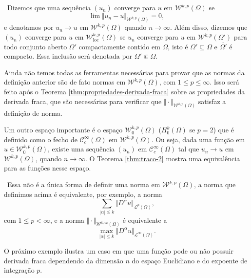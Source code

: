 \documentclass[a4paper, 11pt]{book}
\theoremstyle{definition}
\newcommand{\obs}{\noindent{\textbf{\textcolor{black}{\sffamily Observação:}}}~}
\newcommand{\cC}{\mathcal{C}}
\newcommand{\cL}{\mathcal{L}}
\newcommand{\cW}{\mathcal{W}}
\newcommand{\loc}{\mathrm{loc}}
\begin{document}
\obs Dizemos que uma sequência $(u_n)$ converge para $u$ em $\cW^{k,p}(\Omega)$ se
\[
    \lim \Vert u_n - u \Vert_{\cW^{k,p}(\Omega)} = 0,
\]
e denotamos por $u_n \to u \text{ em } \cW^{k,p}(\Omega)$ quando $n \to \infty$.
Além disso, dizemos que $(u_n)$ converge para $u$ em $\cW^{k,p}_\loc(\Omega)$ se $u_n$ converge para $u$ em $\cW^{k,p}(\Omega')$ para todo conjunto aberto $\Omega'$ compactamente contido em $\Omega$, isto é $\Omega' \subseteq \Omega$ e $\overline{\Omega'}$ é compacto. Essa inclusão será denotada por $\Omega' \Subset \Omega$.

Ainda não temos todas as ferramentas necessárias para provar que as normas da definição anterior são de fato normas em $\cW^{k,p}(\Omega)$, com $1 \leqslant p \leqslant \infty$. Isso será feito após o Teorema \ref{thm:propriedades-derivada-fraca} sobre as propriedades da derivada fraca, que são necessárias para verificar que $\Vert \cdot \Vert_{\cW^{k,p}(\Omega)}$ satisfaz a definição de norma.

Um outro espaço importante é o espaço $\cW^{k,p}_0(\Omega)$ ($H^k_0(\Omega)$ se $p = 2$) que é definido como o fecho de $\cC^{\infty}_c(\Omega)$ em $\cW^{k,p}(\Omega)$. Ou seja, dada uma função em $u \in \cW^{k,p}_0(\Omega)$, existe uma sequência $(u_n)$ em $\cC^{\infty}_c(\Omega)$ tal que $u_n \to u$ em $\cW^{k,p}(\Omega)$, quando $n \to \infty$.
O Teorema \ref{thm:traco-2} mostra uma equivalência para as funções nesse espaço.

\obs Essa não é a única forma de definir uma norma em $\cW^{k,p}(\Omega)$, a norma que definimos acima é equivalente, por exemplo, a norma
\[
    \sum_{|\alpha| \leqslant k} \Vert D^\alpha u \Vert_{\cL^p(\Omega)},
\]
com $1 \leqslant p < \infty$, e a norma $\Vert \cdot \Vert_{\cW^{k,\infty}(\Omega)}$ é equivalente a
\[
    \max_{|\alpha|\leqslant k} \Vert D^\alpha u \Vert_{\cL^\infty(\Omega)}.
\]

O próximo exemplo ilustra um caso em que uma função pode ou não possuir derivada fraca dependendo da dimensão $n$ do espaço Euclidiano e do expoente de integração $p$.
\end{document}
